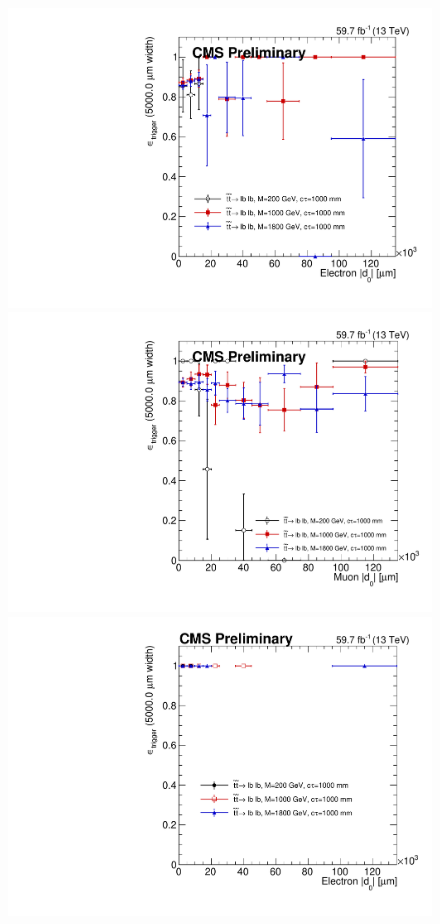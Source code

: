 \begin{figure}
\centering
\includegraphics[scale=0.3]{figures/systematics/trig_eff/emu_2018/electronAbsD0_100000um_variableBins_coarse.pdf}
\includegraphics[scale=0.3]{figures/systematics/trig_eff/emu_2018/muonAbsD0_100000um_variableBins_coarse.pdf}
\includegraphics[scale=0.3]{figures/systematics/trig_eff/ee_2018/electronAbsD0_100000um_variableBins_coarse.pdf}

\end{figure}
